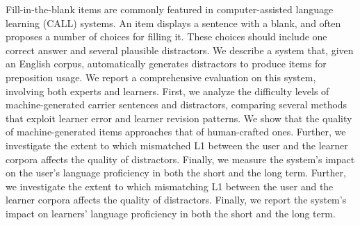 Fill-in-the-blank items are commonly featured in computer-assisted language learning (CALL) systems. An item displays a sentence with a  blank, and often proposes a number of choices for filling it.  These choices should include one correct answer and several plausible distractors.  We describe a system that, given an English corpus, automatically generates distractors to produce items for preposition usage.                          We report a comprehensive evaluation on this system, involving both experts and learners.  First, we analyze the difficulty levels of machine-generated carrier sentences and distractors, comparing several methods that exploit learner error and learner revision patterns.  We show that the quality of machine-generated items approaches that of human-crafted ones. Further, we investigate the extent to which mismatched L1 between the user and the learner corpora affects the quality of distractors.  Finally, we measure the system's impact on the user's language proficiency in both the short and the long term. Further, we investigate the extent to which mismatching L1 between the user and the learner corpora affects the quality of distractors. Finally, we report the system's impact on learners' language proficiency in both the short and the long term.
